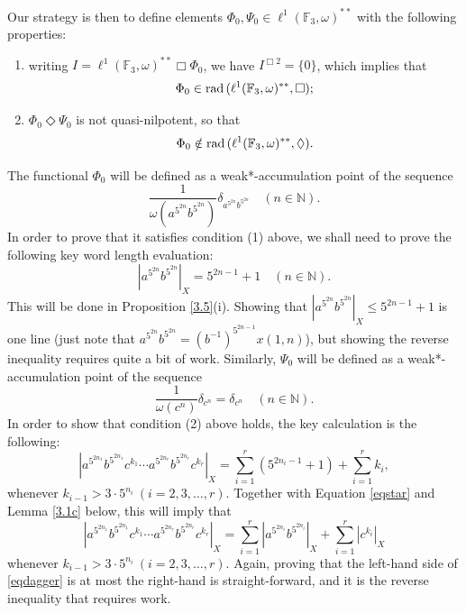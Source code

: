 \documentclass[twoside,11pt]{amsart}
\numberwithin{equation}{section}
\theoremstyle{definition}
\newcommand {\N}{\mathbb N}
\newcommand{\rad}{{\rm rad\,}}
\newcommand{\1}{\mathbbm{1}}
\newcommand{\F}{\mathbb F}
\begin{document}
	Our strategy is then to define elements $\Phi_0, \Psi_0 \in \ell^1(\F_3, \omega)^{**}$ with the following properties:
	\begin{enumerate}
		\item writing $I = \ell^1(\F_3, \omega)^{**}\Box \Phi_0$, we have $I^{\Box 2} = \{ 0 \}$, which implies that
		 $$\Phi_0 \in \rad (\ell^1(\F_3, \omega)^{**}, \Box);$$		
		\item $\Phi_0 \Diamond \Psi_0$ is not quasi-nilpotent, so that $$\Phi_0 \notin \rad( \ell^1(\F_3, \omega)^{**}, \Diamond).$$
	\end{enumerate}
	The functional $\Phi_0$ will be defined as a weak*-accumulation point of the sequence
	$$\frac{1}{\omega(a^{5^{2n}}b^{5^{2n}})} \delta_{a^{5^{2n}}b^{5^{2n}}} \quad (n \in \N).$$
	In order to prove that it satisfies condition (1) above, we shall need to prove the following key word length evaluation:
	\begin{equation}		\label{eqstar}
		|a^{5^{2n}}b^{5^{2n}}|_X =  5^{2n-1} +1 \quad (n \in \N).
	\end{equation}
	This will be done in Proposition \ref{3.5}(i). Showing that $|a^{5^{2n}}b^{5^{2n}}|_X \leq 5^{2n-1} +1$ is one line (just note that $a^{5^{2n}}b^{5^{2n}} = (b^{-1})^{5^{2n-1}}x(1,n)$), but showing the reverse inequality requires quite a bit of work. 	
	Similarly, $\Psi_0$ will be defined as a weak*-accumulation point of the sequence 
	$$\frac{1}{\omega(c^n)} \delta_{c^n} = \delta_{c^n} \quad (n \in \N).$$
	In order to show that condition (2) above holds, the key calculation is the following:
	\begin{equation} 		\label{eqdagger}
		\left|a^{5^{2n_1}} b^{5^{2n_1}} c^{k_1} \cdots a^{5^{2n_r}}b^{5^{2n_r}} c^{k_r} \right|_X =  \sum_{i=1}^r (5^{2n_i-1} +1) + \sum _{i = 1}^r k_i,
	\end{equation}
	whenever $k_{i-1} > 3 \cdot 5^{n_i} \ (i = 2,3, \ldots, r)$. Together with Equation \eqref{eqstar} and Lemma \ref{3.1c} below, this will imply that 
	\begin{equation} 	\label{eqdoubledagger}
		\left|a^{5^{2n_1}} b^{5^{2n_1}} c^{k_1} \cdots a^{5^{2n_r}}b^{5^{2n_r}} c^{k_r} \right|_X  = \sum_{i=1}^r |a^{5^{2n_i}}b^{5^{2n_i}}|_X + \sum_{i=1}^r |c^{k_i}|_X
	\end{equation}
	whenever $k_{i-1} > 3 \cdot 5^{n_i} \ (i = 2,3, \ldots, r)$.
	Again,  proving that the left-hand side of \eqref{eqdagger} is at most the right-hand is straight-forward, and it is the reverse inequality that requires work.
	
\end{document}
